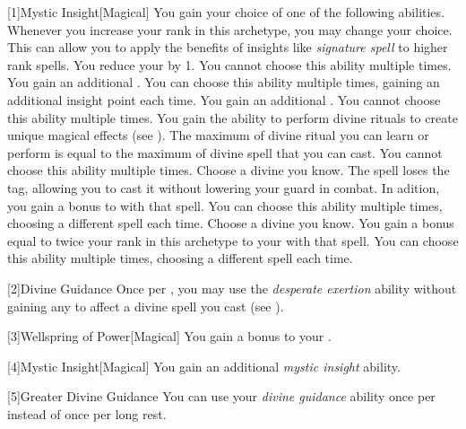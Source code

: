         [1]{Mystic Insight}[Magical]
        You gain your choice of one of the following abilities.
        Whenever you increase your rank in this archetype, you may change your choice.
        This can allow you to apply the benefits of insights like \textit{signature spell} to higher rank spells.
        {
             You reduce your  by 1.
                You cannot choose this ability multiple times.
             You gain an additional .
                You can choose this ability multiple times, gaining an additional insight point each time.
             You gain an additional .
                You cannot choose this ability multiple times.
             You gain the ability to perform divine rituals to create unique magical effects (see ).
                The maximum  of divine ritual you can learn or perform is equal to the maximum  of divine spell that you can cast.
                You cannot choose this ability multiple times.
             Choose a divine  you know.
                The spell loses the  tag, allowing you to cast it without lowering your guard in combat.
                In adition, you gain a  bonus to  with that spell.
                You can choose this ability multiple times, choosing a different spell each time.
             Choose a divine  you know.
                You gain a bonus equal to twice your rank in this archetype to your  with that spell.
                You can choose this ability multiple times, choosing a different spell each time.
        }

        [2]{Divine Guidance} Once per , you may use the \textit{desperate exertion} ability without gaining any  to affect a divine spell you cast (see ).

        [3]{Wellspring of Power}[Magical]
        You gain a  bonus to your  .

        [4]{Mystic Insight}[Magical]
        You gain an additional \textit{mystic insight} ability.

        [5]{Greater Divine Guidance} You can use your \textit{divine guidance} ability once per  instead of once per long rest.

